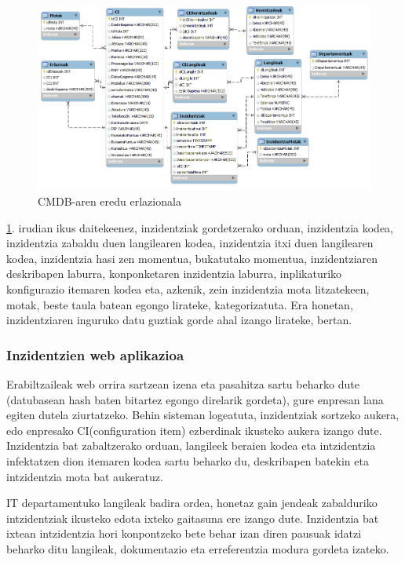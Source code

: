 \begin{figure}
\centering
   \includegraphics[scale=0.4]{irudiak/cmdb.png}
   \caption{CMDB-aren eredu erlazionala}
   \label{fig:cmdb}
\end{figure}

\ref{fig:cmdb}. irudian ikus daitekeenez, inzidentziak gordetzerako orduan, inzidentzia kodea, inzidentzia zabaldu duen langilearen kodea, inzidentzia itxi duen langilearen kodea, inzidentzia hasi zen momentua, bukatutako momentua, inzidentziaren deskribapen laburra, konponketaren inzidentzia laburra, inplikaturiko konfigurazio itemaren kodea eta, azkenik, zein inzidentzia mota litzatekeen, motak, beste taula batean egongo lirateke, kategorizatuta. Era honetan, inzidentziaren inguruko datu guztiak gorde ahal izango lirateke, bertan.

\subsubsection{Inzidentzien web aplikazioa}
\label{sec:webapdis}
Erabiltzaileak web orrira sartzean izena eta pasahitza sartu beharko dute (datubasean hash baten bitartez egongo direlarik gordeta), gure enpresan lana egiten dutela ziurtatzeko. Behin sisteman logeatuta, inzidentziak sortzeko aukera, edo enpresako CI(configuration item) ezberdinak ikusteko aukera izango dute. Inzidentzia bat zabaltzerako orduan, langileek beraien kodea eta intzidentzia infektatzen dion itemaren kodea sartu beharko du, deskribapen batekin eta intzidentzia mota bat aukeratuz. 

IT departamentuko langileak badira ordea, honetaz gain jendeak zabalduriko intzidentziak ikusteko edota ixteko gaitasuna ere izango dute. Inzidentzia bat ixtean intzidentzia hori konpontzeko bete behar izan diren pausuak idatzi beharko ditu langileak, dokumentazio eta erreferentzia modura gordeta izateko.

